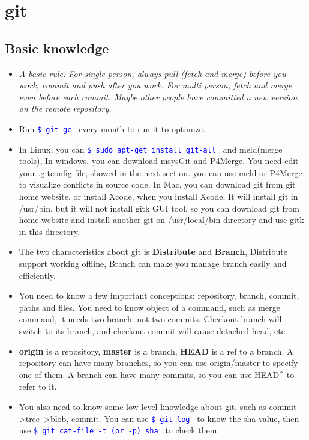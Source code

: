 \documentclass[a4paper,12pt,twoside]{book}
\newcommand{\linuxcommand}[1]{\texttt{\textcolor{blue}{\$ #1 \Pisymbol{psy}{191}}}}
\begin{document}
\section{git}

\subsection{Basic knowledge}
\begin{itemize}
\item \emph{A basic rule:  For single person, always pull (fetch and merge) before you work,  commit and push after you work.  For multi person, fetch and merge even before each commit.  Maybe other people have committed a new version on the remote repository. }

\item Run \linuxcommand{git gc} every month to run it to optimize.

\item In Linux, you can \linuxcommand{sudo apt-get install git-all} and meld(merge tools), In windows, you can download msysGit and P4Merge. You need edit your .gitconfig file, showed in the next section. you can use meld or P4Merge to visualize conflicts in source code. In Mac, you can download git from git home website. or install Xcode, when you install Xcode, It will install git in /usr/bin. but it will not install gitk GUI tool, so you can download git from home website and install another git on /usr/local/bin directory and use gitk in this directory. 

\item The two characteristics about git is \textbf{Distribute} and \textbf{Branch}, Distribute support working offline, Branch can make you manage branch easily and efficiently.

\item You need to know a few important conceptions: repository, branch, commit, paths and files. You need to know object of a command, such as merge command, it needs two branch. not two commits. Checkout branch will switch to its branch, and checkout commit will cause detached-head, etc.  
   
\item \textbf{origin} is a repository, \textbf{master} is a branch, \textbf{HEAD} is a ref to a branch. A repository can have many branches, so you can use origin/master to specify one of them. A branch can have many commits, so you can use HEAD\^{} to refer to it.
    
\item You also need to know some low-level knowledge about git. such as commit-->tree-->blob,  commit. You can use \linuxcommand{git log} to know the sha value, then use \linuxcommand{git cat-file -t (or -p) sha} to check them. 
    

\end{itemize}
\end{document}
